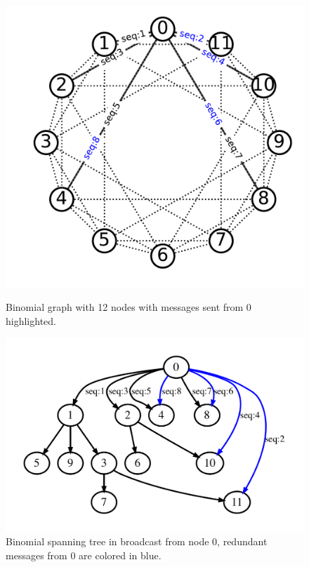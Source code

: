 \documentclass[5p,times,twocolumn]{elsarticle}
\begin{document}
\begin{figure}[ht!]
  \begin{minipage}[t]{.48\linewidth}
    \centering
    \includegraphics[scale=.3]{review_BMG_seq.pdf}\vspace{-2em}
    \caption{Binomial graph with 12 nodes with messages sent from 0 highlighted.}
    \label{fig:bmg}
  \end{minipage}
  \hfill
  \begin{minipage}[t]{.48\linewidth}
    \centering
    \includegraphics[scale=.3]{review_reorder_span.pdf}\vspace{-2em}
    \caption{Binomial spanning tree in broadcast from node 0, redundant messages from 0 are colored in blue.}
    \label{fig:reorder.span}
  \end{minipage}
\end{figure}
\end{document}
